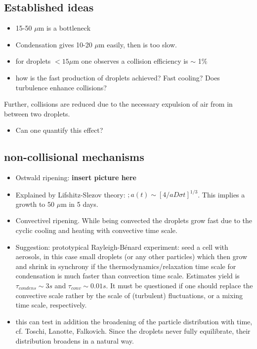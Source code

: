 \documentclass{report}
\begin{document}
\subsection{Established ideas}
\begin{itemize}
 \item 15-50 $\mu$m is a bottleneck
 \item Condensation gives 10-20 $\mu$m easily, then is too slow.
 \item for droplets $<15 \mu$m one observes a collision efficiency is $\sim$ 1\%
 \item how is the fast production of droplets achieved? Fast cooling? 
 Does turbulence enhance collisions?
\end{itemize}

Further, collisions are reduced due to the necessary expulsion of air from in between two droplets.
\begin{itemize}
 \item Can one quantify this effect?
\end{itemize}

\subsection{non-collisional mechanisms}

\begin{itemize}
 \item Ostwald ripening: {\bf \color{red} insert picture here}
 \item Explained by Lifshitz-Slezov theory: $;a(t)\sim [4/a D \sigma t]^{1/3}$.
 This implies a growth to 50 $\mu$m in 5 days.
 \item Convectivel ripening. While being convected the droplets grow fast due to the
 cyclic cooling and heating with convective time scale.
 \item Suggestion: prototypical Rayleigh-B\'enard experiment: seed a cell with aerosols,
 in this case small droplets (or any other particles) which then grow and shrink in synchrony
 if the thermodynamics/relaxation time scale for condensation is 
 much faster than convection time scale. Estimates yield is $\tau_{condens}\sim 3s$ and 
 $\tau_{conv}\sim 0.01s$. It must be questioned if one should replace the convective scale rather
 by the scale of (turbulent) fluctuations, or a mixing time scale, respectively.
 \item this can test in addition the broadening of the particle distribution with time,
   cf. Toschi, Lanotte, Falkovich. Since the droplets never fully equilibrate, their distribution
   broadens in a natural way.
\end{itemize}
\end{document}

